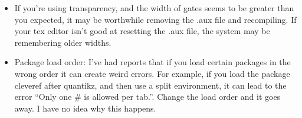 \documentclass[aps,pra,10pt,nofootinbib]{revtex4-2}
\begin{document}
\begin{itemize}
  \item If you're using transparency, and the width of gates seems to be greater than you expected, it may be worthwhile removing the .aux file and recompiling. If your tex editor isn't good at resetting the .aux file, the system may be remembering older widths.
  \item Package load order: I've had reports that if you load certain packages in the wrong order it can create weird errors. For example, if you load the package cleveref after quantikz, and then use a split environment, it can lead to the error ``Only one \# is allowed per tab.''. Change the load order and it goes away. I have no idea why this happens.

\end{itemize}
\end{document}
